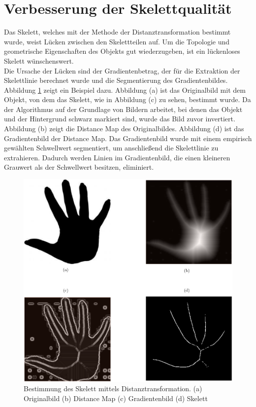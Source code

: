 \section{Verbesserung der Skelettqualität}
Das Skelett, welches mit der Methode der Distanztransformation bestimmt wurde, weist Lücken zwischen den Skelettteilen auf. Um die Topologie und geometrische Eigenschaften des Objekts gut wiederzugeben, ist ein lückenloses Skelett wünschenswert. \\
Die Ursache der Lücken sind der Gradientenbetrag, der für die Extraktion der Skelettlinie berechnet wurde und die Segmentierung des Gradientenbildes. Abbildung \ref{fig:hand-skelett} zeigt ein Beispiel dazu. Abbildung (a) ist das Originalbild mit dem Objekt, von dem das Skelett, wie in Abbildung (c) zu sehen, bestimmt wurde. Da der Algorithmus auf der Grundlage von Bildern arbeitet, bei denen das Objekt und der Hintergrund schwarz markiert sind,
wurde das Bild zuvor invertiert. Abbildung (b) zeigt die Distance Map des Originalbildes. Abbildung (d) ist das Gradientenbild der Distance Map. Das Gradientenbild wurde mit einem empirisch gewählten Schwellwert segmentiert, um anschließend die Skelettlinie zu extrahieren. Dadurch werden Linien im Gradientenbild, die einen kleineren Grauwert als der Schwellwert besitzen, eliminiert. 
\begin{figure}[htbp]
\centering
\includegraphics[width=1.0\linewidth]{./fig/hand}
\caption{Bestimmung des Skelett mittels Distanztransformation. (a) Originalbild (b) Distance Map (c) Gradientenbild (d) Skelett}
\label{fig:hand-skelett}
\end{figure}
